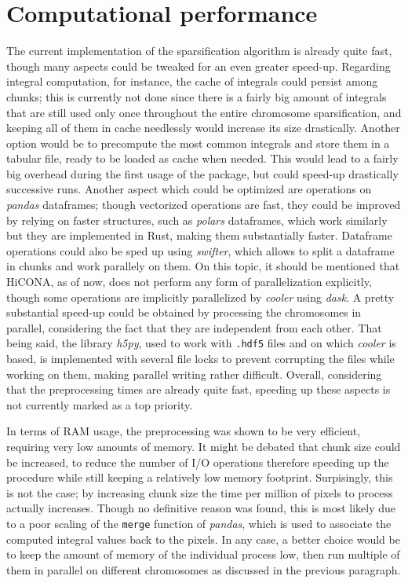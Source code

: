 \section{Computational performance}

The current implementation of the sparsification algorithm is already quite fast, though many aspects could be tweaked for an even greater speed-up. Regarding integral computation, for instance, the cache of integrals could persist among chunks; this is currently not done since there is a fairly big amount of integrals that are still used only once throughout the entire chromosome sparsification, and keeping all of them in cache needlessly would increase its size drastically. Another option would be to precompute the most common integrals and store them in a tabular file, ready to be loaded as cache when needed. This would lead to a fairly big overhead during the first usage of the package, but could speed-up drastically successive runs. Another aspect which could be optimized are operations on \textit{pandas} dataframes; though vectorized operations are fast, they could be improved by relying on faster structures, such as \textit{polars}\cite{polars2023} dataframes, which work similarly but they are implemented in Rust, making them substantially faster. Dataframe operations could also be sped up using \textit{swifter}\cite{swifter2023}, which allows to split a dataframe in chunks and work parallely on them. On this topic, it should be mentioned that HiCONA, as of now, does not perform any form of parallelization explicitly, though some operations are implicitly parallelized by \textit{cooler} using \textit{dask}\cite{dask2023}. A pretty substantial speed-up could be obtained by processing the chromosomes in parallel, considering the fact that they are independent from each other. That being said, the library \textit{h5py}\cite{h5py2023}, used to work with \texttt{.hdf5} files and on which \textit{cooler} is based, is implemented with several file locks to prevent corrupting the files while working on them, making parallel writing rather difficult. Overall, considering that the preprocessing times are already quite fast, speeding up these aspects is not currently marked as a top priority.

In terms of RAM usage, the preprocessing was shown to be very efficient, requiring very low amounts of memory. It might be debated that chunk size could be increased, to reduce the number of I/O operations therefore speeding up the procedure while still keeping a relatively low memory footprint. Surpisingly, this is not the case; by increasing chunk size the time per million of pixels to process actually increases. Though no definitive reason was found, this is most likely due to a poor scaling of the \texttt{merge} function of \textit{pandas}, which is used to associate the computed integral values back to the pixels. In any case, a better choice would be to keep the amount of memory of the individual process low, then run multiple of them in parallel on different chromosomes as discussed in the previous paragraph. 

